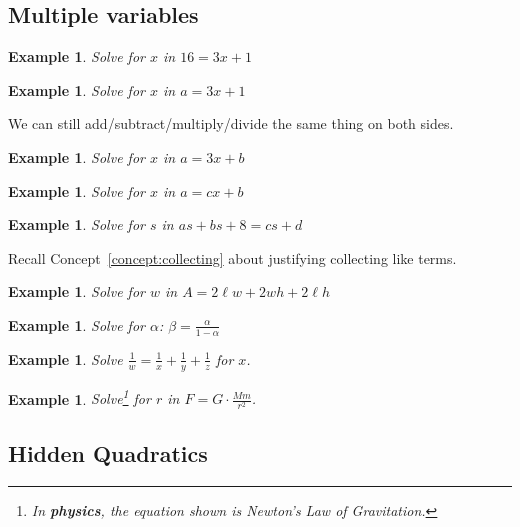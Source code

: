 \documentclass[twoside]{tufte-handout}
\newcounter{ekcounter}%
\theoremstyle{ekimcustom}
\newtheorem{exm}[ekcounter]{Example}
\begin{document}

\subsection{Multiple variables}

\begin{exm}{}
Solve for $x$ in $16 = 3x + 1$
\end{exm}
\vskip50pt
\begin{exm}{}
Solve for $x$ in $a = 3x + 1$
\end{exm}
\begin{bconcept}{}{}
We can still add/subtract/multiply/divide the same thing on both sides.
\end{bconcept}
\vskip50pt
\begin{exm}{}
Solve for $x$ in $a = 3x + b$
\end{exm}
\vskip50pt
\begin{exm}{}
Solve for $x$ in $a = cx + b$
\end{exm}
\vskip50pt

\begin{exm}{}
Solve for $s$ in $as+bs+8=cs+d$
\end{exm}
Recall Concept~\ref{concept:collecting} about justifying collecting like terms.
\vskip80pt
\begin{exm}{}
Solve for $w$ in $A=2\ell w + 2 w h + 2 \ell h$
\end{exm}


 \begin{exm}{Solve for $\alpha$: $\beta=\frac{\alpha}{1-\alpha}$}
\end{exm}\vspace{4cm}


\begin{exm}{Solve $\frac{1}{w}=\frac{1}{x}+\frac{1}{y}+\frac{1}{z}$ for $x$.  }
\end{exm}\vspace{4cm}

\begin{exm}Solve\footnote{In {\bf physics}, the equation shown is Newton's Law of Gravitation.} for $r$ in $F = G \cdot \frac{Mm}{r^2}$.
\end{exm}\vspace{4cm}





\subsection{Hidden Quadratics}
\end{document}
